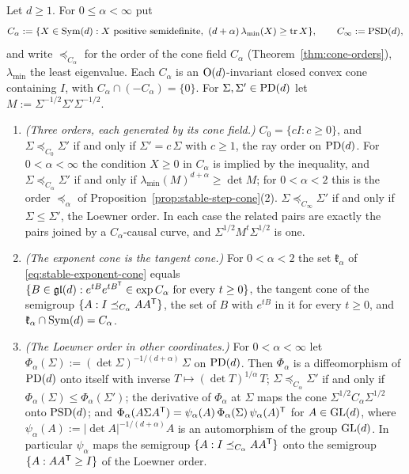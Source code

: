 \begin{proposition}\label{prop:stable-order-generated}
Let $d \ge 1$. For $0 \le \alpha < \infty$ put
\[
  C_\alpha := \{X \in \mathrm{Sym}(d) : X \text{ positive semidefinite},\ (d+\alpha)\,\lambda_{\min}(X) \ge \operatorname{tr} X\} ,
  \qquad C_\infty := \mathrm{PSD}(d) ,
\]
and write $\preceq_{C_\alpha}$ for the order of the cone field $C_\alpha$ (Theorem~\ref{thm:cone-orders}), $\lambda_{\min}$ the least
eigenvalue. Each $C_\alpha$ is an $\mathrm{O}(d)$-invariant closed convex cone containing $I$, with
$C_\alpha \cap (-C_\alpha) = \{0\}$. For $\Sigma, \Sigma' \in \mathrm{PD}(d)$ let
$M := \Sigma^{-1/2}\Sigma'\Sigma^{-1/2}$.
\begin{enumerate}
\item \emph{(Three orders, each generated by its cone field.)} $C_0 = \{cI : c \ge 0\}$, and
$\Sigma \preceq_{C_0} \Sigma'$ if and only if $\Sigma' = c\,\Sigma$ with $c \ge 1$, the ray order on $\mathrm{PD}(d)$.
For $0 < \alpha < \infty$ the condition $X \ge 0$ in $C_\alpha$ is implied by the inequality, and
$\Sigma \preceq_{C_\alpha} \Sigma'$ if and only if $\lambda_{\min}(M)^{d+\alpha} \ge \det M$; for
$0 < \alpha < 2$ this is the order $\preceq_\alpha$ of Proposition~\ref{prop:stable-step-cone}(2). $\Sigma \preceq_{C_\infty}
\Sigma'$ if and only if $\Sigma \le \Sigma'$, the Loewner order. In each case the related pairs are exactly
the pairs joined by a $C_\alpha$-causal curve, and $\Sigma^{1/2}M^t\Sigma^{1/2}$ is one.
\item \emph{(The exponent cone is the tangent cone.)} For $0 < \alpha < 2$ the set $\mathfrak k_\alpha$ of
\ref{eq:stable-exponent-cone} equals $\{B \in \mathfrak{gl}(d) : e^{tB}e^{tB^{\mathsf{T}}} \in \exp C_\alpha \text{ for every }
t \ge 0\}$, the tangent cone of the semigroup $\{A : I \preceq_{C_\alpha} AA^{\mathsf{T}}\}$, the set of $B$ with $e^{tB}$ in
it for every $t \ge 0$, and
$\mathfrak k_\alpha \cap \mathrm{Sym}(d) = C_\alpha$.
\item \emph{(The Loewner order in other coordinates.)} For $0 < \alpha < \infty$ let
$\Phi_\alpha(\Sigma) := (\det\Sigma)^{-1/(d+\alpha)}\,\Sigma$ on $\mathrm{PD}(d)$. Then $\Phi_\alpha$ is a
diffeomorphism of $\mathrm{PD}(d)$ onto itself with inverse $T \mapsto (\det T)^{1/\alpha}\,T$;
$\Sigma \preceq_{C_\alpha} \Sigma'$ if and only if $\Phi_\alpha(\Sigma) \le \Phi_\alpha(\Sigma')$; the derivative of
$\Phi_\alpha$ at $\Sigma$ maps the cone $\Sigma^{1/2}C_\alpha\Sigma^{1/2}$ onto $\mathrm{PSD}(d)$; and
$\Phi_\alpha(A\Sigma A^{\mathsf{T}}) = \psi_\alpha(A)\,\Phi_\alpha(\Sigma)\,\psi_\alpha(A)^{\mathsf{T}}$ for
$A \in \mathrm{GL}(d)$, where $\psi_\alpha(A) := |\det A|^{-1/(d+\alpha)}A$ is an automorphism of the group
$\mathrm{GL}(d)$. In particular $\psi_\alpha$ maps the semigroup $\{A : I \preceq_{C_\alpha} AA^{\mathsf{T}}\}$ onto the semigroup
$\{A : AA^{\mathsf{T}} \ge I\}$ of the Loewner order.
\end{enumerate}
\end{proposition}

